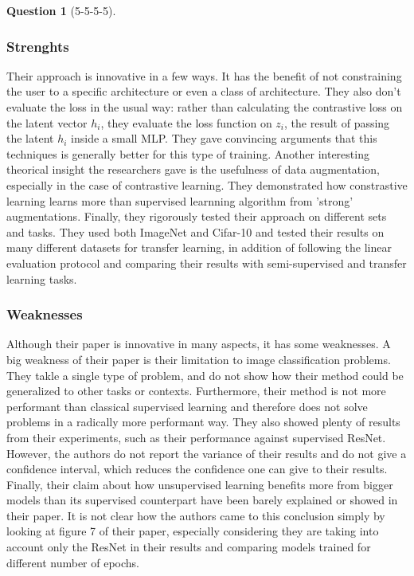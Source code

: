 \documentclass[12pt]{article}
\theoremstyle{definition}
\newtheorem{exercise}{Question}%
\begin{document}
\begin{exercise}[5-5-5-5]
{  \subsubsection*{Strenghts}
    Their approach is innovative in a few ways. It has the benefit of not
    constraining the user to a specific architecture or even a class of
    architecture.
    They also don't evaluate the loss in the usual way: rather
    than calculating the contrastive loss on the latent vector $h_{i}$, they
    evaluate the loss function on $z_{i}$, the result of passing the latent
    $h_{i}$ inside a small MLP. They gave convincing arguments that this
    techniques is generally better for this type of training.
    Another interesting theorical insight the researchers gave is the usefulness
    of data augmentation, especially in the case of contrastive learning. They
    demonstrated how constrastive learning learns more than supervised learnning
    algorithm from 'strong' augmentations.
    Finally, they rigorously tested their approach on different sets and
    tasks. They used both ImageNet and Cifar-10 and tested their results on
    many different datasets for transfer learning, in addition of following the
    linear evaluation protocol and comparing their results with semi-supervised
    and transfer learning tasks.
  \subsubsection*{Weaknesses}

    Although their paper is innovative in many aspects, it has some
    weaknesses. A big weakness of their paper is their limitation to image
    classification problems. They takle a single type of problem, and do not
    show how their method could be generalized to other tasks or contexts.
    Furthermore, their method is not more performant than classical supervised
    learning and therefore does not solve problems in a radically more
    performant way.
    They also showed plenty of results from their experiments, such as their
    performance against supervised ResNet. However, the authors do not report
    the variance of their results and do not give a confidence interval, which
    reduces the confidence one can give to their results.
    Finally, their claim about how unsupervised learning benefits more from
    bigger models than its supervised counterpart have been barely explained or
    showed in their paper. It is not clear how the authors came to this
    conclusion simply by looking at figure 7 of their paper, especially
    considering they are taking into account only the ResNet in their results
    and comparing models trained for different number of epochs.

}
\end{exercise}
\end{document}
